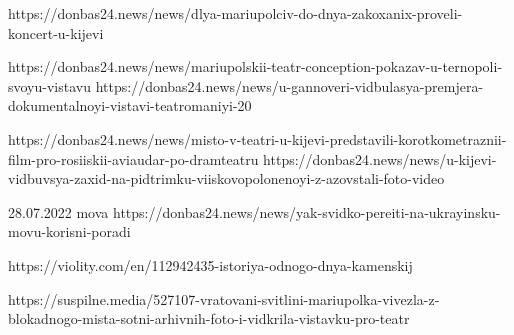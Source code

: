  
 
 
 
 

https://donbas24.news/news/dlya-mariupolciv-do-dnya-zakoxanix-proveli-koncert-u-kijevi

https://donbas24.news/news/mariupolskii-teatr-conception-pokazav-u-ternopoli-svoyu-vistavu
https://donbas24.news/news/u-gannoveri-vidbulasya-premjera-dokumentalnoyi-vistavi-teatromaniyi-20

https://donbas24.news/news/misto-v-teatri-u-kijevi-predstavili-korotkometraznii-film-pro-rosiiskii-aviaudar-po-dramteatru
https://donbas24.news/news/u-kijevi-vidbuvsya-zaxid-na-pidtrimku-viiskovopolonenoyi-z-azovstali-foto-video


28.07.2022 mova
https://donbas24.news/news/yak-svidko-pereiti-na-ukrayinsku-movu-korisni-poradi

https://violity.com/en/112942435-istoriya-odnogo-dnya-kamenskij


https://suspilne.media/527107-vratovani-svitlini-mariupolka-vivezla-z-blokadnogo-mista-sotni-arhivnih-foto-i-vidkrila-vistavku-pro-teatr

